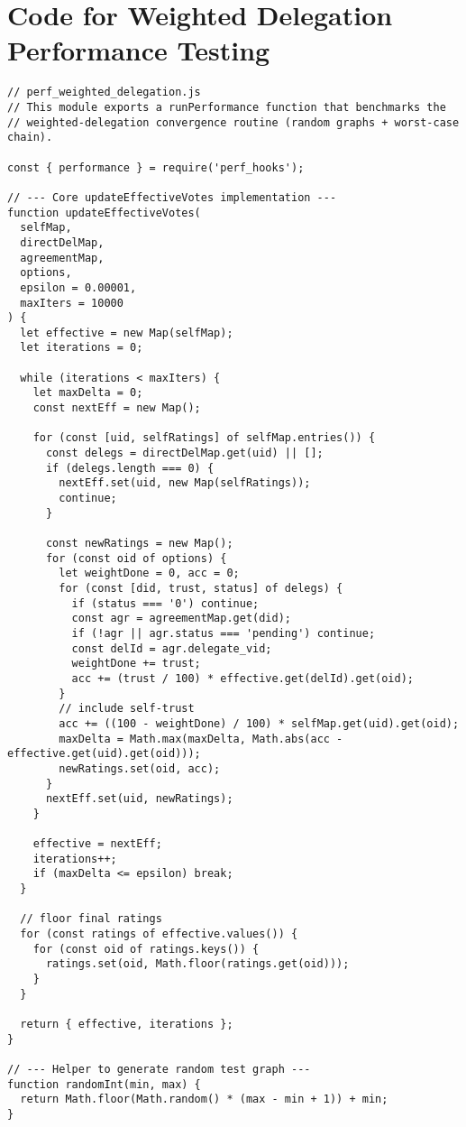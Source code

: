 \chapter{Code for Weighted Delegation Performance Testing}\label{appendix:perf_weighted}
\begin{verbatim}
// perf_weighted_delegation.js
// This module exports a runPerformance function that benchmarks the
// weighted-delegation convergence routine (random graphs + worst-case chain).

const { performance } = require('perf_hooks');

// --- Core updateEffectiveVotes implementation ---
function updateEffectiveVotes(
  selfMap,
  directDelMap,
  agreementMap,
  options,
  epsilon = 0.00001,
  maxIters = 10000
) {
  let effective = new Map(selfMap);
  let iterations = 0;

  while (iterations < maxIters) {
    let maxDelta = 0;
    const nextEff = new Map();

    for (const [uid, selfRatings] of selfMap.entries()) {
      const delegs = directDelMap.get(uid) || [];
      if (delegs.length === 0) {
        nextEff.set(uid, new Map(selfRatings));
        continue;
      }

      const newRatings = new Map();
      for (const oid of options) {
        let weightDone = 0, acc = 0;
        for (const [did, trust, status] of delegs) {
          if (status === '0') continue;
          const agr = agreementMap.get(did);
          if (!agr || agr.status === 'pending') continue;
          const delId = agr.delegate_vid;
          weightDone += trust;
          acc += (trust / 100) * effective.get(delId).get(oid);
        }
        // include self-trust
        acc += ((100 - weightDone) / 100) * selfMap.get(uid).get(oid);
        maxDelta = Math.max(maxDelta, Math.abs(acc - effective.get(uid).get(oid)));
        newRatings.set(oid, acc);
      }
      nextEff.set(uid, newRatings);
    }

    effective = nextEff;
    iterations++;
    if (maxDelta <= epsilon) break;
  }

  // floor final ratings
  for (const ratings of effective.values()) {
    for (const oid of ratings.keys()) {
      ratings.set(oid, Math.floor(ratings.get(oid)));
    }
  }

  return { effective, iterations };
}

// --- Helper to generate random test graph ---
function randomInt(min, max) {
  return Math.floor(Math.random() * (max - min + 1)) + min;
}


\end{verbatim}
